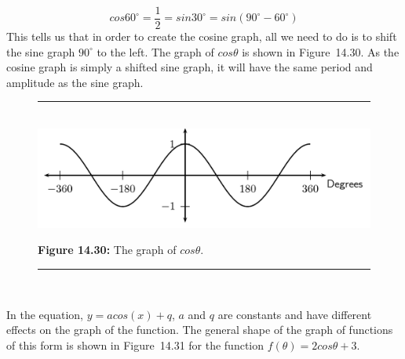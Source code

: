     \begin{equation}
    cos{60}^{\circ }=\frac{1}{2}=sin{30}^{\circ }=sin\left({90}^{\circ }-{60}^{\circ }\right)\tag{14.33}
      \end{equation}
        \label{m39414*id87280}This tells us that in order to create the cosine graph, all we need to do is to shift the sine graph ${90}^{\circ }$ to the left. The graph of $cos\theta $ is shown in Figure~14.30. As the cosine graph is simply a shifted sine graph, it will have the same period and amplitude as the sine graph.\par 
    \setcounter{subfigure}{0}
	\begin{figure}[H] %
    \begin{center}
    \rule[.1in]{\figurerulewidth}{.005in} \\
        \label{m39414*uid50!!!underscore!!!media}\label{m39414*uid50!!!underscore!!!printimage}\includegraphics{col11306.imgs/m39414_MG10C15_024.png} %
      \vspace{2pt}
    \vspace{\rubberspace}\par \begin{cnxcaption}
	  \small \textbf{Figure 14.30: }The graph of $cos\theta $.
	\end{cnxcaption}
    \vspace{.1in}
    \rule[.1in]{\figurerulewidth}{.005in} \\
    \end{center}
 \end{figure}       
      \label{m39414*uid51}
            \nopagebreak
        \label{m39414*id87386}In the equation, $y=acos\left(x\right)+q$, $a$ and $q$ are constants and have different effects on the graph of the function. The general shape of the graph of functions of this form is shown in Figure~14.31 for the function $f\left(\theta \right)=2cos\theta +3$.\par 
    \setcounter{subfigure}{0}
